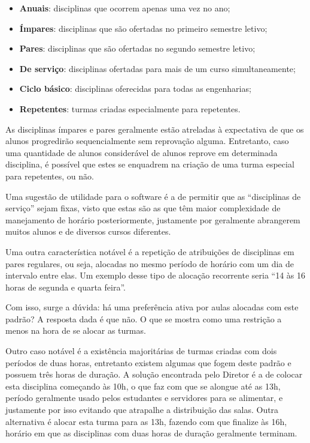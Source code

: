 \begin{itemize}
  \item \textbf{Anuais}: disciplinas que ocorrem apenas uma vez no ano;
  \item \textbf{Ímpares}: disciplinas que são ofertadas no primeiro semestre letivo;
  \item \textbf{Pares}: disciplinas que são ofertadas no segundo semestre letivo;
  \item \textbf{De serviço}: disciplinas ofertadas para mais de um curso simultaneamente;
  \item \textbf{Ciclo básico}: disciplinas oferecidas para todas as engenharias;
  \item \textbf{Repetentes}: turmas criadas especialmente para repetentes.
\end{itemize}


As disciplinas ímpares e pares geralmente estão atreladas à expectativa de que os alunos progredirão sequencialmente sem reprovação alguma. Entretanto, caso uma quantidade de alunos considerável de alunos reprove em determinada disciplina, é possível que estes se enquadrem na criação de uma turma especial para repetentes, ou não.

Uma sugestão de utilidade para o software é a de permitir que as ``disciplinas de serviço'' sejam fixas, visto que estas são as que têm maior complexidade de manejamento de horário posteriormente, justamente por geralmente abrangerem muitos alunos e de diversos cursos diferentes.

Uma outra característica notável é a repetição de atribuições de disciplinas em pares regulares, ou seja, alocadas no mesmo período de horário com um dia de intervalo entre elas. Um exemplo desse tipo de alocação recorrente seria ``14 às 16 horas de segunda e quarta feira''.

Com isso, surge a dúvida: há uma preferência ativa por aulas alocadas com este padrão? A resposta dada é que não. O que se mostra como uma restrição a menos na hora de se alocar as turmas.

Outro caso notável é a existência majoritárias de turmas criadas com dois períodos de duas horas, entretanto existem algumas que fogem deste padrão e possuem três horas de duração. A solução encontrada pelo Diretor é a de colocar esta disciplina começando às 10h, o que faz com que se alongue até as 13h, período geralmente usado pelos estudantes e servidores para se alimentar, e justamente por isso evitando que atrapalhe a distribuição das salas. Outra alternativa é alocar esta turma para as 13h, fazendo com que finalize às 16h, horário em que as disciplinas com duas horas de duração geralmente terminam.

